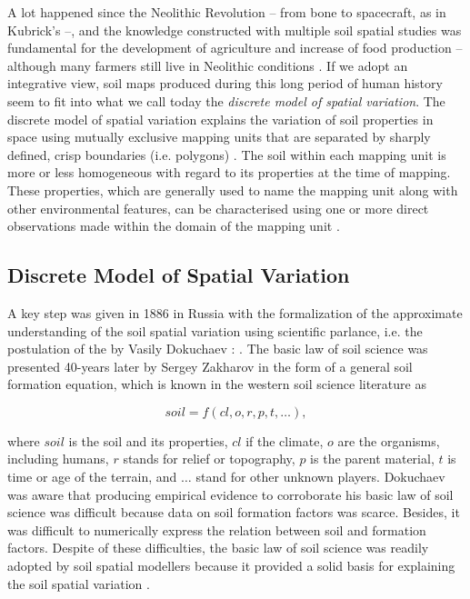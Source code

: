 A lot happened since the Neolithic Revolution \cite{BrevikEtAl2010} -- from bone to spacecraft, as in 
Kubrick's \footKubrick{} --, and the knowledge constructed with multiple soil spatial studies was fundamental 
for the development of agriculture and increase of food production -- although many farmers still live in 
Neolithic conditions \cite{MazoyerEtAl2008}. If we adopt an integrative view, soil maps produced during this 
long period of human history seem to fit into what we call today the \emph{discrete model of spatial 
variation}. The discrete model of spatial variation explains the variation of soil properties in space 
using mutually exclusive mapping units that are separated by sharply defined, crisp boundaries (i.e. polygons) 
\cite{Heuvelink1996, Legros2006}. The soil\footsoil{} within each mapping unit is more or less homogeneous 
with regard to its properties at the time of mapping. These properties, which are generally used to name the 
mapping unit along with other environmental features, can be characterised using one or more direct 
observations made within the domain of the mapping unit \cite{WebsterEtAl1990, Rossiter2000, 
Legros2006}.

\subsection{Discrete Model of Spatial Variation}

A key step was given in 1886 in Russia with the formalization of the approximate understanding of the soil 
spatial variation using scientific parlance, i.e. the postulation of the  by 
Vasily Dokuchaev \cite{Florinsky2012}: . The basic law of soil science was presented 40-years later by Sergey Zakharov in the form of a 
general soil formation equation, which is known in the western soil science literature as \cite{Jenny1941, 
Florinsky2012}

\begin{equation}\label{eqn:chap02-clorpt}
 soil = f(cl, o, r, p, t, \ldots),
\end{equation}

\noindent where $soil$ is the soil and its properties, $cl$ if the climate, $o$ are the organisms, including 
humans, $r$ stands for relief or topography, $p$ is the parent material, $t$ is time or age of the terrain, 
and $\ldots$ stand for other unknown players. Dokuchaev was aware that producing empirical evidence to 
corroborate his basic law of soil science was difficult because data on soil formation factors was scarce. 
Besides, it was difficult to numerically express the relation between soil and formation factors. Despite of 
these difficulties, the basic law of soil science was readily adopted by soil spatial modellers because it 
provided a solid basis for explaining the soil spatial variation \cite{Smith1986}.

